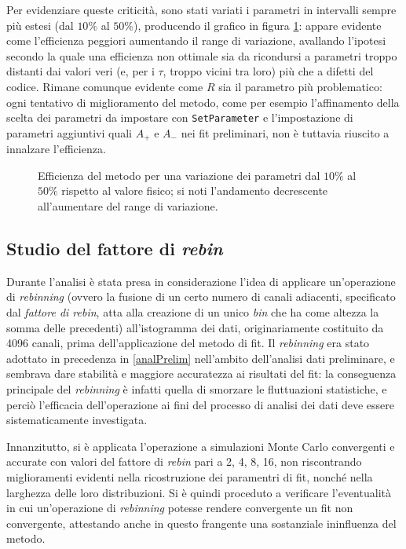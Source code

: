 \documentclass[10pt, oneside, a4paper]{article}   	%
\begin{document}
Per evidenziare queste criticità, sono stati variati i parametri in intervalli sempre più estesi (dal $10\%$ al $50\%$), producendo il grafico in figura \ref{fig:finalematrix}: appare evidente come l'efficienza peggiori aumentando il range di variazione, avallando l'ipotesi secondo la quale una efficienza non ottimale sia da ricondursi a parametri troppo distanti dai valori veri (e, per i $\tau$, troppo vicini tra loro) più che a difetti del codice. Rimane comunque evidente come $R$ sia il parametro più problematico: ogni tentativo di miglioramento del metodo, come per esempio l'affinamento della scelta dei parametri da impostare con \lstinline{SetParameter} e l'impostazione di parametri aggiuntivi quali $A_+$ e $A_-$ nei fit preliminari, non è tuttavia riuscito a innalzare l'efficienza.
%
\begin{figure}[H]
  \centering
  
  \caption{Efficienza del metodo per una variazione dei parametri dal $10 \%$ al $50\%$ rispetto al valore fisico; si noti l'andamento decrescente all'aumentare del range di variazione.}
  \label{fig:finalematrix}
\end{figure}
%
%
\subsection{Studio del fattore di \emph{rebin}} \label{parrebin}
Durante l'analisi è stata presa in considerazione l'idea di applicare un'operazione di \textit{rebinning} (ovvero la fusione di un certo numero di canali adiacenti, specificato dal \textit{fattore di rebin}, atta alla creazione di un unico \emph{bin} che ha come altezza la somma delle precedenti) all'istogramma dei dati, originariamente costituito da 4096 canali, prima dell'applicazione del metodo di fit. Il \textit{rebinning} era stato adottato in precedenza in \cref{analPrelim} nell'ambito dell'analisi dati preliminare, e sembrava dare stabilità e maggiore accuratezza ai risultati del fit: la conseguenza principale del \textit{rebinning} è infatti quella di smorzare le fluttuazioni statistiche, e perciò l'efficacia dell'operazione ai fini del processo di analisi dei dati deve essere sistematicamente investigata.

Innanzitutto, si è applicata l'operazione a simulazioni Monte Carlo convergenti e accurate con valori del fattore di \emph{rebin} pari a 2, 4, 8, 16, non riscontrando miglioramenti evidenti nella ricostruzione dei paramentri di fit, nonché nella larghezza delle loro distribuzioni. Si è quindi proceduto a verificare l'eventualità in cui un'operazione di \textit{rebinning} potesse rendere convergente un fit non convergente, attestando anche in questo frangente una sostanziale ininfluenza del metodo.
\end{document}

